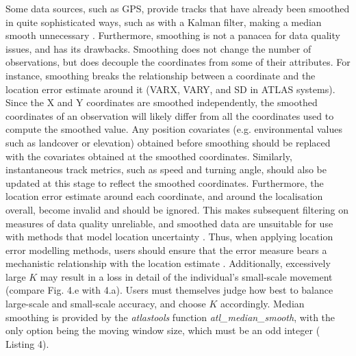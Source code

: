 \begin{refsection}[sorting=nyt]
    Some data sources, such as GPS, provide tracks that have already been smoothed in quite sophisticated ways, such as with a Kalman filter, making a median smooth unnecessary \citep{kaplan2005}.
    Furthermore, smoothing is not a panacea for data quality issues, and has its drawbacks.
    Smoothing does not change the number of observations, but does decouple the coordinates from some of their attributes.
    For instance, smoothing breaks the relationship between a coordinate and the location error estimate around it (VARX, VARY, and SD in ATLAS systems).
    Since the X and Y coordinates are smoothed independently, the smoothed coordinates of an observation will likely differ from all the coordinates used to compute the smoothed value.
    Any position covariates (e.g. environmental values such as landcover or elevation) obtained before smoothing should be replaced with the covariates obtained at the smoothed coordinates.
    Similarly, instantaneous track metrics, such as speed and turning angle, should also be updated at this stage to reflect the smoothed coordinates.
    Furthermore, the location error estimate around each coordinate, and around the localisation overall, become invalid and should be ignored.
    This makes subsequent filtering on measures of data quality unreliable, and smoothed data are unsuitable for use with methods that model location uncertainty \citep{noonan2019, fleming2014a, fleming2020, calabrese2016}.
    Thus, when applying location error modelling methods, users should ensure that the error measure bears a mechanistic relationship with the location estimate \citep[see][ for more details]{fleming2020, noonan2019}.
    Additionally, excessively large $K$ may result in a loss in detail of the individual's small-scale movement (compare Fig. 4.e with 4.a).
    Users must themselves judge how best to balance large-scale and small-scale accuracy, and choose $K$ accordingly.
    Median smoothing is provided by the \textit{atlastools} function \textit{atl\_median\_smooth}, with the only option being the moving window size, which must be an odd integer ({\color{red} Listing} 4).



\end{refsection}
